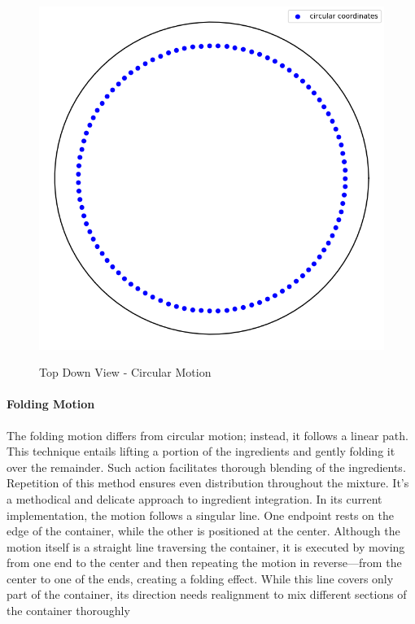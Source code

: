 \begin{figure}[H]
    \includegraphics[scale=0.35]{Graphics/motions/circular_motion.png}
    \centering
    \label{fig:circularMotion}
    \caption{Top Down View - Circular Motion}
\end{figure}

\paragraph{Folding Motion}
The folding motion differs from circular motion; instead, it follows a linear path.
This technique entails lifting a portion of the ingredients and gently folding it over the remainder. 
Such action facilitates thorough blending of the ingredients. Repetition of this method ensures even distribution throughout the mixture. 
It's a methodical and delicate approach to ingredient integration.
\newline
\newline
In its current implementation, the motion follows a singular line. One endpoint rests on the edge of the container, while the other is positioned at the center.
Although the motion itself is a straight line traversing the container, it is executed by moving from one end to the center and then repeating 
the motion in reverse—from the center to one of the ends, creating a folding effect.
While this line covers only part of the container, its direction needs realignment to mix different sections of the container thoroughly

